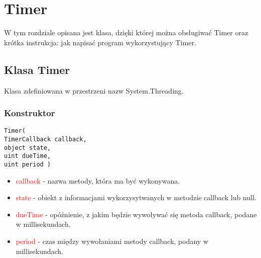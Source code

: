 \documentclass{article}
\begin{document}
\section{Timer}
W tym rozdziale opisana jest klasa, dzięki której można obsługiwać Timer oraz krótka instrukcja: jak napisać program wykorzystujący Timer.
\subsection{Klasa Timer}
Klasa zdefiniowana w przestrzeni nazw System.Threading.
\subsubsection{Konstruktor}
\begin{lstlisting}[frame=single]
Timer(
TimerCallback callback, 
object state, 
uint dueTime, 
uint period )
\end{lstlisting}
\begin{itemize}
\item \textcolor{red}{callback} - nazwa metody, która ma być wykonywana.
\item \textcolor{red}{state} - obiekt z informacjami wykorzysytwanych w metodzie callback lub null.
\item \textcolor{red}{dueTime} - opóźnienie, z jakim będzie wywoływać się metoda callback, podane w millisekundach.
\item \textcolor{red}{period} - czas między wywołaniami metody callback, podany w millisekundach.
\end{itemize}
\end{document}
